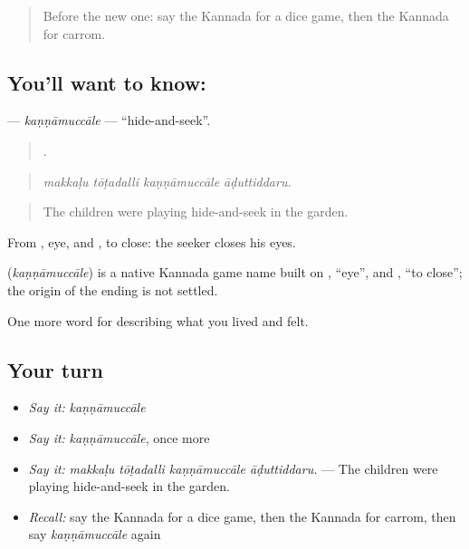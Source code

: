 \label{lesson:KA-C531-kannamuccale}



\begin{quote}
Before the new one: say the Kannada for a dice game, then the Kannada for carrom.
\end{quote}

\subsection*{You'll want to know: }
\textbf{} — \emph{kaṇṇāmuccāle} — \textquotedblleft{}hide-and-seek\textquotedblright{}.

\begin{quote}
   .
\end{quote}

\begin{quote}
\emph{makkaḷu tōṭadalli kaṇṇāmuccāle āḍuttiddaru.}
\end{quote}

\begin{quote}
The children were playing hide-and-seek in the garden.
\end{quote}

From , eye, and , to close: the seeker closes his eyes.

\begin{cousinweb}
\textbf{} (\emph{kaṇṇāmuccāle}) is a native Kannada game name built on , \textquotedblleft{}eye\textquotedblright{}, and , \textquotedblleft{}to close\textquotedblright{}; the origin of the ending is not settled.
\end{cousinweb}

\begin{grammarlens}[title={What you've built}]
One more word for describing what you lived and felt.
\end{grammarlens}

\subsection*{Your turn}
\begin{itemize}
\raggedright
  \item \emph{Say it:} \emph{kaṇṇāmuccāle}
  \item \emph{Say it:} \emph{kaṇṇāmuccāle}, once more
  \item \emph{Say it:} \emph{makkaḷu tōṭadalli kaṇṇāmuccāle āḍuttiddaru.} — The children were playing hide-and-seek in the garden.
  \item \emph{Recall:} say the Kannada for a dice game, then the Kannada for carrom, then say \emph{kaṇṇāmuccāle} again
\end{itemize}

